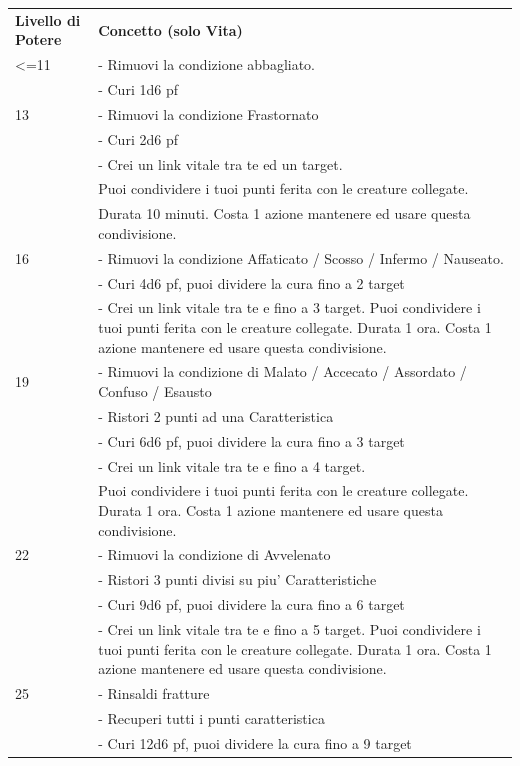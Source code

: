\documentclass[a4paper,11pt,twoside,openany]{book}
\begin{document}
	\begin{longtable}{L{3cm} L{13cm}}
		\toprule
		\textbf{Livello di Potere} & \textbf{Concetto (solo Vita)}\tabularnewline	
		<=11 & - Rimuovi la condizione abbagliato.\\
		& - Curi 1d6 pf\\
		13 & - Rimuovi la condizione Frastornato\\
		& - Curi 2d6 pf\\
		& - Crei un link vitale tra te ed un target.\\
		& Puoi condividere i tuoi punti ferita con le creature collegate.\\
		& Durata 10 minuti. Costa 1 azione mantenere ed usare questa condivisione. \\
		16 & - Rimuovi la condizione Affaticato / Scosso / Infermo / Nauseato.\\
		& - Curi 4d6 pf, puoi dividere la cura fino a 2 target\\
		& - Crei un link vitale tra te e fino a 3 target. Puoi condividere i tuoi punti ferita con le creature collegate. Durata 1 ora. Costa 1 azione mantenere ed usare questa condivisione.\\
		19 & - Rimuovi la condizione di Malato / Accecato / Assordato / Confuso / Esausto\\
		& - Ristori 2 punti ad una Caratteristica\\
		& - Curi 6d6 pf, puoi dividere la cura fino a 3 target\\
		& - Crei un link vitale tra te e fino a 4 target.\\
		& Puoi condividere i tuoi punti ferita con le creature collegate. Durata 1 ora. Costa 1 azione mantenere ed usare questa condivisione.\\
		22 &- Rimuovi la condizione di Avvelenato\\
		& - Ristori 3 punti divisi su piu' Caratteristiche\\
		& - Curi 9d6 pf, puoi dividere la cura fino a 6 target\\
		&- Crei un link vitale tra te e fino a 5 target. Puoi condividere i tuoi punti ferita con le creature collegate. Durata 1 ora. Costa 1 azione mantenere ed usare questa condivisione.\\
		25 & - Rinsaldi fratture\\
		& - Recuperi tutti i punti caratteristica\\
		& - Curi 12d6 pf, puoi dividere la cura fino a 9 target\\

\end{longtable}
\end{document}
